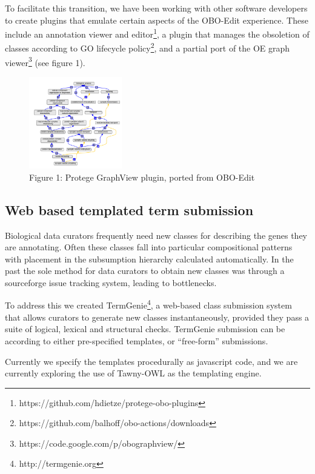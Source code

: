\documentclass{llncs}
\begin{document}
To facilitate this transition, we have been working with other
software developers to create plugins that emulate certain aspects of
the OBO-Edit experience. These include an annotation viewer and
editor\footnote{https://github.com/hdietze/protege-obo-plugins}, a
plugin that manages the obsoletion of classes according to GO
lifecycle policy\footnote{https://github.com/balhoff/obo-actions/downloads}, and a partial
port of the OE graph
viewer\footnote{https://code.google.com/p/obographview/} (see figure 1).

\begin{figure}
\label{gv}
\center
\includegraphics[height=4cm]{gv-plugin}
\caption{Figure 1: Protege GraphView plugin, ported from OBO-Edit}
\end{figure}

\subsection{Web based templated term submission}

Biological data curators frequently need new classes for describing
the genes they are annotating. Often these classes fall into
particular compositional patterns with placement in the subsumption
hierarchy calculated automatically. In the past the sole method for
data curators to obtain new classes was through a sourceforge issue
tracking system, leading to bottlenecks.

To address this we created TermGenie\cite{Dietze2014}\footnote{http://termgenie.org}, a web-based
class submission system that allows curators to generate new classes
instantaneously, provided they pass a suite of logical, lexical and
structural checks. TermGenie submission can be according to either
pre-specified templates, or ``free-form'' submissions.

Currently we specify the templates procedurally as javascript code,
and we are currently exploring the use of Tawny-OWL\cite{lord2013semantic} as the
templating engine.
\end{document}
